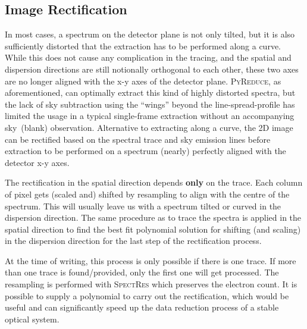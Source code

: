 \documentclass[fleqn,usenatbib]{mnras}
\begin{document}
\subsection{Image Rectification}
In most cases, a spectrum on the detector plane is not only tilted,
but it is also sufficiently distorted that the extraction
has to be performed along a curve. While this does not cause any
complication in the tracing, and the spatial and dispersion
directions are still notionally orthogonal to each other, these two
axes are no longer aligned with the x-y axes of the detector plane.
\textsc{PyReduce}, as aforementioned, can optimally extract this
kind of highly distorted spectra, but the lack of sky subtraction
using the ``wings'' beyond the line-spread-profile has limited the
usage in a typical single-frame extraction without an accompanying
sky~(blank) observation. Alternative to extracting along a curve,
the 2D image can be rectified based on the spectral trace and sky
emission lines before extraction to be performed on a spectrum
(nearly) perfectly aligned with the detector x-y axes.

The rectification in the spatial direction depends \textbf{only}
on the trace. Each column of pixel gets (scaled and) shifted by
resampling to align with the centre of the spectrum. This will
usually leave us with a spectrum tilted or curved in the dispersion
direction. The same procedure as to trace the spectra is applied
in the spatial direction to find the best fit polynomial solution
for shifting (and scaling) in the dispersion direction for the
last step of the rectification process.

At the time of writing, this process is only possible if there is
one trace. If more than one trace is found/provided, only the first
one will get processed. The resampling is performed with
\textsc{SpectRes} which preserves the electron count. It is possible
to supply a polynomial to carry out the rectification, which would
be useful and can significantly speed up the data reduction process
of a stable optical system.
\end{document}
